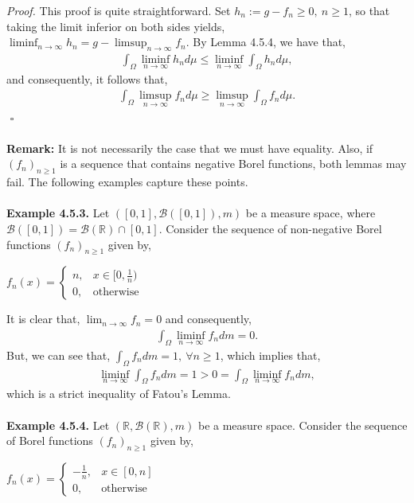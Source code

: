 \documentclass{article}
\begin{document}
\textit{Proof.} This proof is quite straightforward. Set $h_n := g - f_n \geq 0, \ n \geq 1$, so that taking the limit inferior on both sides yields, $\liminf_{n\to\infty}h_n = g - \limsup_{n\to\infty}f_n$. By Lemma 4.5.4, we have that,
\begin{eqnarray}
\nonumber
\int_\Omega\liminf_{n\to\infty}h_n d\mu \leq \liminf_{n\to\infty}\int_\Omega h_n d\mu,
\end{eqnarray}
and consequently, it follows that,
\begin{eqnarray}
\nonumber
\int_\Omega\limsup_{n\to\infty}f_n d\mu \geq \limsup_{n\to\infty}\int_\Omega f_n d\mu.
\end{eqnarray}
${}$ \hfill $\square$ \\\\
\textbf{Remark:} It is not necessarily the case that we must have equality. Also, if $(f_n)_{n\geq1}$ is a sequence that contains negative Borel functions, both lemmas may fail. The following examples capture these points.\\\\
\textbf{Example 4.5.3.} Let $([0,1],\mathcal{B}([0,1]),m)$ be a measure space, where $\mathcal{B}([0,1]) = \mathcal{B}(\mathbb{R}) \cap [0,1]$. Consider the sequence of non-negative Borel functions $(f_n)_{n\geq1}$ given by,
\begin{center}
	$f_n(x) =
	\begin{cases}
	n, & x \in [0,\frac{1}{n}) \\
	0, & \text{otherwise}
	\end{cases}$
\end{center}
It is clear that, $\lim_{n\to\infty}f_n = 0$ and consequently,
\begin{eqnarray}
\nonumber
\int_{\Omega} \liminf_{n\to\infty} f_n dm = 0.
\end{eqnarray}
But, we can see that, $\int_\Omega f_n dm = 1, \ \forall n\geq1$, which implies that,
\begin{eqnarray}
\nonumber
\liminf_{n\to\infty} \int_\Omega f_n dm = 1 > 0 = \int_{\Omega} \liminf_{n\to\infty} f_n dm,
\end{eqnarray}
which is a strict inequality of Fatou's Lemma.\\\\
\textbf{Example 4.5.4.} Let $(\mathbb{R},\mathcal{B}(\mathbb{R}),m)$ be a measure space. Consider the sequence of Borel functions $(f_n)_{n\geq1}$ given by,
\begin{center}
	$f_n(x) =
	\begin{cases}
	-\frac{1}{n}, & x \in [0,n] \\
	0, & \text{otherwise}
	\end{cases}$
\end{center}
\end{document}
